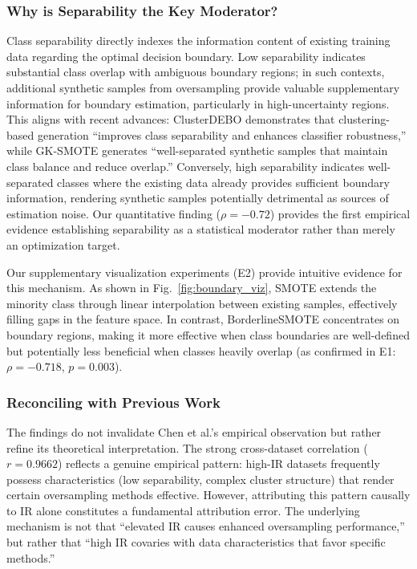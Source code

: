 \documentclass{ijSmartGrid}
\theoremstyle{definition}
\begin{document}
\subsubsection{Why is Separability the Key Moderator?}
\indent Class separability directly indexes the information content of existing training data regarding the optimal decision boundary. Low separability indicates substantial class overlap with ambiguous boundary regions; in such contexts, additional synthetic samples from oversampling provide valuable supplementary information for boundary estimation, particularly in high-uncertainty regions. This aligns with recent advances: ClusterDEBO \cite{clusterdebo2025} demonstrates that clustering-based generation ``improves class separability and enhances classifier robustness,'' while GK-SMOTE \cite{gk_smote2025} generates ``well-separated synthetic samples that maintain class balance and reduce overlap.'' Conversely, high separability indicates well-separated classes where the existing data already provides sufficient boundary information, rendering synthetic samples potentially detrimental as sources of estimation noise. Our quantitative finding ($\rho=-0.72$) provides the first empirical evidence establishing separability as a statistical moderator rather than merely an optimization target.

Our supplementary visualization experiments (E2) provide intuitive evidence for this mechanism. As shown in Fig.~\ref{fig:boundary_viz}, SMOTE extends the minority class through linear interpolation between existing samples, effectively filling gaps in the feature space. In contrast, BorderlineSMOTE concentrates on boundary regions, making it more effective when class boundaries are well-defined but potentially less beneficial when classes heavily overlap (as confirmed in E1: $\rho = -0.718$, $p = 0.003$).

\subsubsection{Reconciling with Previous Work}
\indent The findings do not invalidate Chen et al.'s empirical observation but rather refine its theoretical interpretation. The strong cross-dataset correlation ($r=0.9662$) reflects a genuine empirical pattern: high-IR datasets frequently possess characteristics (low separability, complex cluster structure) that render certain oversampling methods effective. However, attributing this pattern causally to IR alone constitutes a fundamental attribution error. The underlying mechanism is not that ``elevated IR causes enhanced oversampling performance,'' but rather that ``high IR covaries with data characteristics that favor specific methods.''
\end{document}
